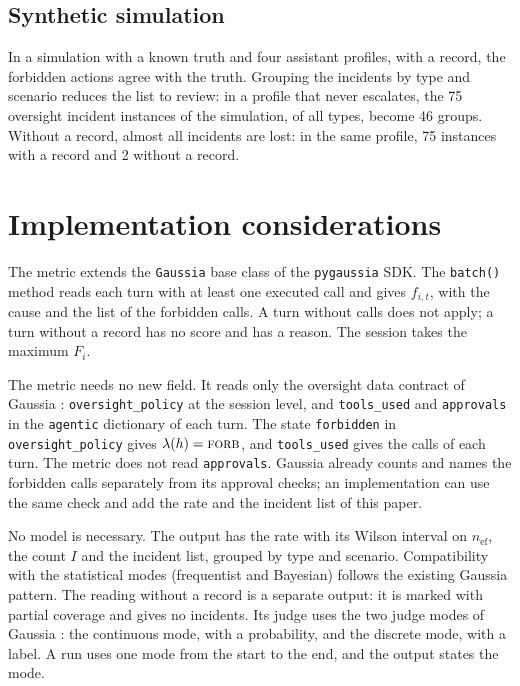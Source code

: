 \documentclass[11pt,a4paper]{article}
\begin{document}
\subsection{Synthetic simulation}

In a simulation with a known truth and four assistant profiles, with a record, the forbidden actions agree with the
truth. Grouping the incidents by type and scenario reduces the list to review: in a profile that never
escalates, the 75 oversight incident instances of the simulation, of all types, become 46 groups. Without a
record, almost all incidents are lost: in the same profile, 75 instances with a record and 2 without a record.

\section{Implementation considerations}

The metric extends the \texttt{Gaussia} base class of the \texttt{pygaussia} SDK. The \texttt{batch()} method reads each turn with at least one
executed call and gives $f_{i,t}$, with the cause and the list of the forbidden calls. A turn without calls does
not apply; a turn without a record has no score and has a reason. The session takes the maximum $F_i$.

The metric needs no new field. It reads only the oversight data contract of Gaussia \cite{gaussia2026}: \texttt{oversight\_policy} at the session
level, and \texttt{tools\_used} and \texttt{approvals} in the \texttt{agentic} dictionary of each turn. The state \texttt{forbidden} in \texttt{oversight\_policy} gives
$\lambda(h) = \textsc{forb}$, and \texttt{tools\_used} gives the calls of each turn. The metric does not read
\texttt{approvals}. Gaussia already counts and names the forbidden calls separately from its approval checks;
an implementation can use the same check and add the rate and the incident list of this paper.

No model is necessary. The output has the rate with its Wilson interval on $n_{\mathrm{ef}}$, the count $I$
and the incident list, grouped by type and scenario. Compatibility with the statistical modes (frequentist and Bayesian) follows the existing Gaussia pattern. The reading without a record is a separate
output: it is marked with partial coverage and gives no incidents. Its judge uses the two judge modes of Gaussia \cite{gaussia2026}: the continuous mode, with a probability, and the
discrete mode, with a label. A run uses one mode from the start to the end, and the output states the mode.
\end{document}
